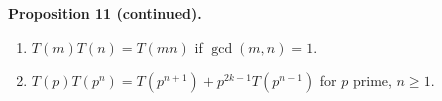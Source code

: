 \textbf{Proposition 11 (continued).}
\begin{enumerate}
\item[(72)] $T(m)T(n) = T(mn)$ if $\gcd(m,n) = 1$.
\item[(73)] $T(p)T(p^n) = T(p^{n+1}) + p^{2k-1} T(p^{n-1})$ for $p$ prime, $n \geq 1$.
\end{enumerate}

